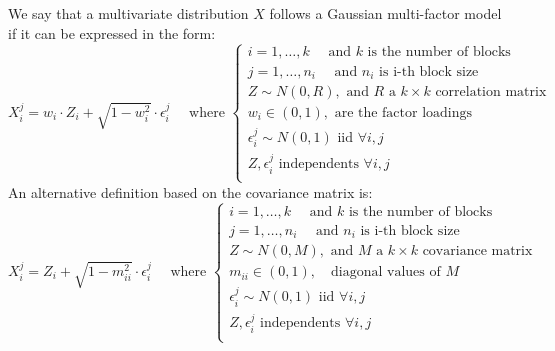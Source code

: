 \documentclass[11pt,fleqn]{book} %
\begin{document}
\begin{definition}
\label{def:gmfm}
	We say that a multivariate distribution $X$ follows a Gaussian multi-factor
	model if it can be expressed in the form:
	\begin{displaymath}
		X_i^j = w_i \cdot Z_i + \sqrt{1-w_i^2} \cdot \epsilon_i^j
		\quad \text{ where } \left\{
		\begin{array}{l}
			i = 1, \dots, k \quad \text{ and $k$ is the number of blocks}    \\
			j = 1, \dots, n_i \quad \text{ and $n_i$ is i-th block size}     \\
			Z \sim N(0,R), \text{ and $R$ a $k {\times} k$ correlation matrix} \\
			w_i \in (0,1), \text{ are the factor loadings }                  \\
			\epsilon_i^j \sim N(0,1) \text { iid } \forall i,j               \\
			Z, \epsilon_i^j \text{ independents } \forall i,j                \\
		\end{array}
		\right.
	\end{displaymath}
An alternative definition based on the covariance matrix is:
	\begin{displaymath}
		X_i^j = Z_i + \sqrt{1-m_{ii}^2} \cdot \epsilon_i^j
		\quad \text{ where } \left\{
		\begin{array}{l}
			i = 1, \dots, k \quad \text{ and $k$ is the number of blocks}    \\
			j = 1, \dots, n_i \quad \text{ and $n_i$ is i-th block size}     \\
			Z \sim N(0,M), \text{ and $M$ a $k {\times} k$ covariance matrix} \\
			m_{ii} \in (0,1), \quad \text{diagonal values of $M$}            \\
			\epsilon_i^j \sim N(0,1) \text { iid } \forall i,j               \\
			Z, \epsilon_i^j \text{ independents } \forall i,j                \\
		\end{array}
		\right.
	\end{displaymath}
\end{definition}
\end{document}
